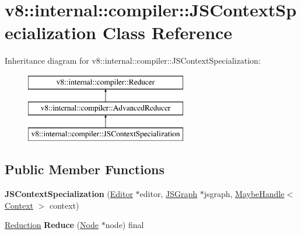 \hypertarget{classv8_1_1internal_1_1compiler_1_1_j_s_context_specialization}{}\section{v8\+:\+:internal\+:\+:compiler\+:\+:J\+S\+Context\+Specialization Class Reference}
\label{classv8_1_1internal_1_1compiler_1_1_j_s_context_specialization}
Inheritance diagram for v8\+:\+:internal\+:\+:compiler\+:\+:J\+S\+Context\+Specialization\+:\begin{figure}[H]
\begin{center}
\leavevmode
\includegraphics[height=3.000000cm]{classv8_1_1internal_1_1compiler_1_1_j_s_context_specialization}
\end{center}
\end{figure}
\subsection*{Public Member Functions}
\begin{DoxyCompactItemize}
\item 
{\bfseries J\+S\+Context\+Specialization} (\hyperlink{classv8_1_1internal_1_1compiler_1_1_advanced_reducer_1_1_editor}{Editor} $\ast$editor, \hyperlink{classv8_1_1internal_1_1compiler_1_1_j_s_graph}{J\+S\+Graph} $\ast$jsgraph, \hyperlink{classv8_1_1internal_1_1_maybe_handle}{Maybe\+Handle}$<$ \hyperlink{classv8_1_1internal_1_1_context}{Context} $>$ context)\hypertarget{classv8_1_1internal_1_1compiler_1_1_j_s_context_specialization_a96b3e6da59e0ed33b83188e5a09ddd80}{}\label{classv8_1_1internal_1_1compiler_1_1_j_s_context_specialization_a96b3e6da59e0ed33b83188e5a09ddd80}

\item 
\hyperlink{classv8_1_1internal_1_1compiler_1_1_reduction}{Reduction} {\bfseries Reduce} (\hyperlink{classv8_1_1internal_1_1compiler_1_1_node}{Node} $\ast$node) final\hypertarget{classv8_1_1internal_1_1compiler_1_1_j_s_context_specialization_a85165ee6b4f17c82b3f21c8f282ae82b}{}\label{classv8_1_1internal_1_1compiler_1_1_j_s_context_specialization_a85165ee6b4f17c82b3f21c8f282ae82b}

\end{DoxyCompactItemize}
